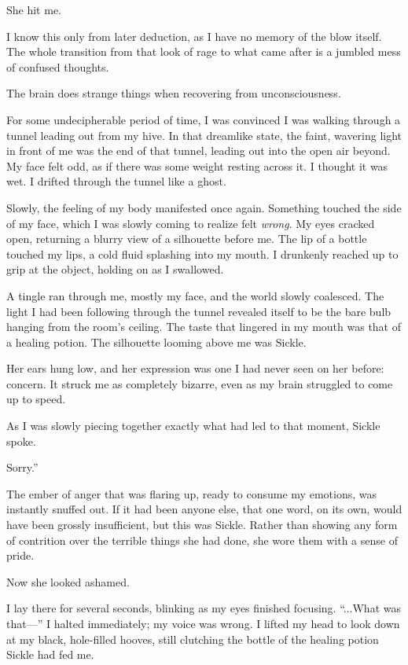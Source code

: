 She hit me.

I know this only from later deduction, as I have no memory of the blow itself. The whole transition from that look of rage to what came after is a jumbled mess of confused thoughts.

The brain does strange things when recovering from unconsciousness.

For some undecipherable period of time, I was convinced I was walking through a tunnel leading out from my hive. In that dreamlike state, the faint, wavering light in front of me was the end of that tunnel, leading out into the open air beyond. My face felt odd, as if there was some weight resting across it. I thought it was wet. I drifted through the tunnel like a ghost.

Slowly, the feeling of my body manifested once again. Something touched the side of my face, which I was slowly coming to realize felt \textit{wrong}. My eyes cracked open, returning a blurry view of a silhouette before me. The lip of a bottle touched my lips, a cold fluid splashing into my mouth. I drunkenly reached up to grip at the object, holding on as I swallowed.

A tingle ran through me, mostly my face, and the world slowly coalesced. The light I had been following through the tunnel revealed itself to be the bare bulb hanging from the room’s ceiling. The taste that lingered in my mouth was that of a healing potion. The silhouette looming above me was Sickle.

Her ears hung low, and her expression was one I had never seen on her before: concern. It struck me as completely bizarre, even as my brain struggled to come up to speed.

As I was slowly piecing together exactly what had led to that moment, Sickle spoke.

\leavevmode{}Sorry.”

The ember of anger that was flaring up, ready to consume my emotions, was instantly snuffed out. If it had been anyone else, that one word, on its own, would have been grossly insufficient, but this was Sickle. Rather than showing any form of contrition over the terrible things she had done, she wore them with a sense of pride.

Now she looked ashamed.

I lay there for several seconds, blinking as my eyes finished focusing. “...What was that—” I halted immediately; my voice was wrong. I lifted my head to look down at my black, hole-filled hooves, still clutching the bottle of the healing potion Sickle had fed me.

